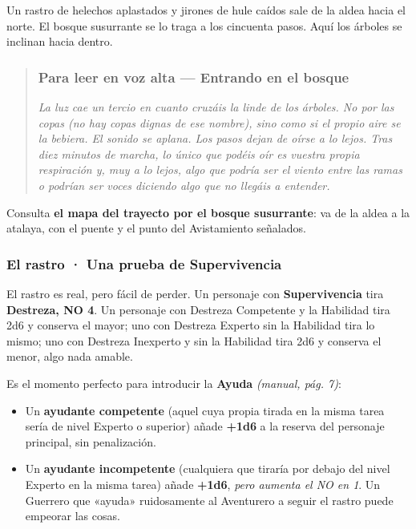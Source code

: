 \documentclass[10pt,a4paper]{article}
\newcommand{\tightlist}{\setlength{\itemsep}{0pt}\setlength{\parskip}{0pt}}
\begin{document}
Un rastro de helechos aplastados y jirones de hule caídos sale de la aldea hacia el norte. El bosque susurrante se lo traga a los cincuenta pasos. Aquí los árboles se inclinan hacia dentro.

\begin{quote}
\subsubsection{Para leer en voz alta --- Entrando en el bosque}\label{para-leer-entrando-en-el-bosque}

\emph{La luz cae un tercio en cuanto cruzáis la linde de los árboles. No por las copas (no hay copas dignas de ese nombre), sino como si el propio aire se la bebiera. El sonido se aplana. Los pasos dejan de oírse a lo lejos. Tras diez minutos de marcha, lo único que podéis oír es vuestra propia respiración y, muy a lo lejos, algo que podría ser el viento entre las ramas o podrían ser voces diciendo algo que no llegáis a entender.}
\end{quote}

Consulta \textbf{el mapa del trayecto por el bosque susurrante}: va de la aldea a la atalaya, con el puente y el punto del Avistamiento señalados.

\subsubsection{El rastro · Una prueba de Supervivencia}\label{el-rastro-prueba-de-supervivencia}

El rastro es real, pero fácil de perder. Un personaje con \textbf{Supervivencia} tira \textbf{Destreza, NO 4}. Un personaje con Destreza Competente y la Habilidad tira 2d6 y conserva el mayor; uno con Destreza Experto sin la Habilidad tira lo mismo; uno con Destreza Inexperto y sin la Habilidad tira 2d6 y conserva el menor, algo nada amable.

Es el momento perfecto para introducir la \textbf{Ayuda} \emph{(manual, pág. 7)}:

\begin{itemize}
\tightlist
\item
  Un \textbf{ayudante competente} (aquel cuya propia tirada en la misma tarea sería de nivel Experto o superior) añade \textbf{+1d6} a la reserva del personaje principal, sin penalización.
\item
  Un \textbf{ayudante incompetente} (cualquiera que tiraría por debajo del nivel Experto en la misma tarea) añade \textbf{+1d6}, \emph{pero aumenta el NO en 1}. Un Guerrero que «ayuda» ruidosamente al Aventurero a seguir el rastro puede empeorar las cosas.
\end{itemize}
\end{document}
